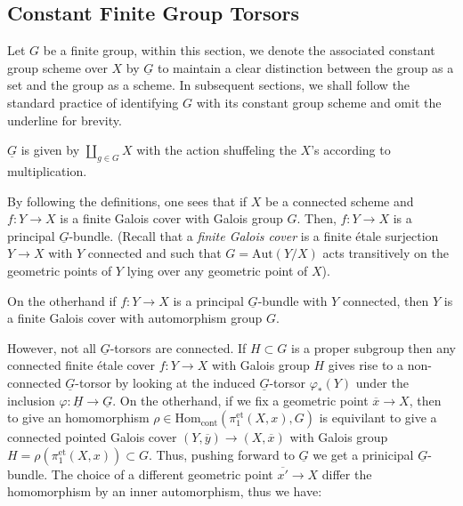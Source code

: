 
\subsection*{Constant Finite Group Torsors}

Let $G$ be a finite group, within this section, we denote the associated constant group scheme over $X$ by $\underline{G}$ to maintain a clear distinction between the group as a set and the group as a scheme. In subsequent sections, we shall follow the standard practice of identifying $G$ with its constant group scheme and omit the underline for brevity.

$\underline{G}$ is given by $\coprod_{g \in G} X$ with the action shuffeling the $X$'s according to multiplication.

By following the definitions, one sees that if $X$ be a connected scheme and $f : Y \to X$ is a finite Galois cover with Galois group $G$. 
Then, $f : Y \to X$ is a principal $\underline{G}$-bundle.
(Recall that a \textit{finite Galois cover} is a finite étale surjection $Y \to X$ with $Y$ connected and such that 
$G = \text{Aut}(Y/X)$ acts transitively on the geometric points of $Y$ lying over any geometric point of $X$).

On the otherhand if $f: Y \to X$ is a principal $\underline{G}$-bundle with $Y$ connected, then $Y$ is a finite Galois cover with
automorphism group $G$.

However, not all $\underline{G}$-torsors are connected. If $H\subset G$ is a proper subgroup then any connected finite \'etale cover $f: Y \to X$ with 
Galois group $H$ gives rise to a non-connected $\underline{G}$-torsor by looking at the induced $\underline{G}$-torsor $\varphi_*(Y)$ under the inclusion $\varphi: \underline{H} \to \underline{G}$.
On the otherhand, if we fix a geometric point $\overline{x} \to X$, then to give an homomorphism
$\rho \in \mathrm{Hom}_{\mathrm{cont}}(\pi_1^{\mathrm{et}}(X, x), G)$ is equivilant to give a connected pointed Galois cover
$(Y, \overline{y}) \to (X, \overline{x})$ with Galois group $H=\rho(\pi_1^{\mathrm{et}}(X, x)) \subset G$. 
Thus, pushing forward to $\underline{G}$ we get a prinicipal $\underline{G}$-bundle. The choice of a different geometric point $\overline{x'} \to X$
differ the homomorphism by an inner automorphism, thus we have:

